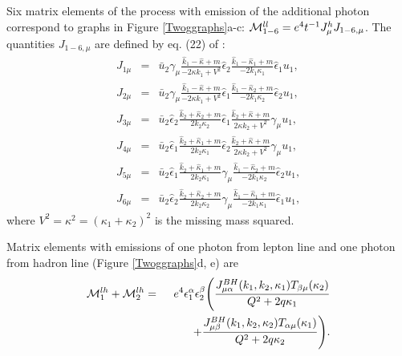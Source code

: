 \documentclass[aps,prd,reprint,groupedaddress,preprintnumbers,showpacs]{revtex4-1}
\begin{document}
Six matrix elements of the process with emission of the additional photon correspond 
to graphs in Figure \ref{Twoggraphs}a-c: 
${\cal M}^{ll}_{1-6}=e^4t^{-1}J_\mu^h J_{1-6,\mu}$. 
The quantities $J_{1-6,\mu}$ are defined by eq. (22) of \cite{AkushevichIlyichev2012}:
\begin{eqnarray}
J_{1\mu}&=& 
{\bar u}_2 
\gamma_\mu 
\frac{{\hat k}_1-{\hat \kappa}+m}{-2\kappa k_1+V^2}
{\hat \epsilon}_2
\frac{{\hat k}_1-{\hat \kappa}_1+m}{-2k_1\kappa_1}
{\hat \epsilon}_1
u_1,
\nonumber \\
J_{2\mu}&=& 
{\bar u}_2 
\gamma_\mu 
\frac{{\hat k}_1-{\hat \kappa}+m}{-2\kappa k_1+V^2}
{\hat \epsilon}_1
\frac{{\hat k}_1-{\hat \kappa}_2+m}
{-2k_1\kappa_2}{\hat \epsilon}_2
u_1,
\nonumber \\
J_{3\mu}&=& 
{\bar u}_2 
{\hat \epsilon}_2
\frac{{\hat k}_2+{\hat \kappa_2}+m}{2k_2\kappa_2}
{\hat \epsilon}_1
\frac{{\hat k}_2+{\hat \kappa }+m}{2\kappa k_2+V^2}
\gamma_\mu 
u_1,
\nonumber \\
J_{4\mu}&=& 
{\bar u}_2 
{\hat \epsilon}_1
\frac{{\hat k}_2+{\hat \kappa_1}+m}{2k_2\kappa_1}
{\hat \epsilon}_2
\frac{{\hat k}_2+{\hat \kappa }+m}{2\kappa k_2+V^2}
\gamma_\mu 
u_1,
\nonumber \\
J_{5\mu}&=& 
{\bar u}_2 
{\hat \epsilon}_1
\frac{{\hat k}_2+{\hat \kappa_1}+m}{2k_2\kappa_1}
\gamma_\mu 
\frac{{\hat k}_1-{\hat \kappa}_2+m}{-2k_1\kappa_2}
{\hat \epsilon}_2
u_1,
\nonumber \\
J_{6\mu}&=& 
{\bar u}_2 
{\hat \epsilon}_2
\frac{{\hat k}_2+{\hat \kappa_2}+m}{2k_2\kappa_2}
\gamma_\mu 
\frac{{\hat k}_1-{\hat \kappa}_1+m}{-2k_1\kappa_1}
{\hat \epsilon}_1
u_1,
\end{eqnarray}
where $V^2=\kappa^2=(\kappa_1+\kappa_2)^2$ is the missing mass squared.

Matrix elements with emissions of one photon from lepton line and one photon from hadron line (Figure \ref{Twoggraphs}d, e) are
\begin{eqnarray}
 {\cal  M}^{lh}_1+{\cal  M}^{lh}_2&=&e^4\epsilon_1^\alpha\epsilon_2^\beta
\Biggl(\frac{J_{\mu\alpha}^{BH}(k_1,k_2,\kappa _1)T_{\beta\mu}(\kappa _2) }{Q^2+2q\kappa_1}
\nonumber\\&&\qquad \;
+\frac{J_{\mu\beta}^{BH}(k_1,k_2,\kappa _2)T_{\alpha\mu}(\kappa _1)}{Q^2+2q\kappa_2}
\Biggr)
. 
\end{eqnarray}
\end{document}
